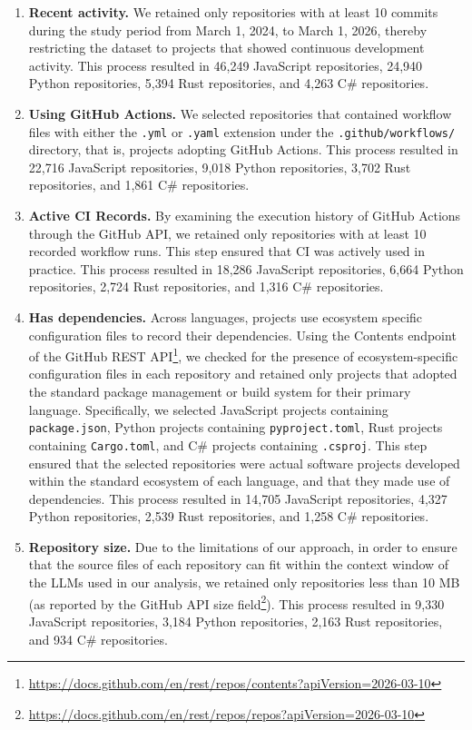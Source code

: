 \begin{enumerate}[label={\textbf{(PS\arabic*).}}, leftmargin=50pt]
    \item \textbf{Recent activity.}
    We retained only repositories with at least 10 commits during the study period from March 1, 2024, to March 1, 2026, thereby restricting the dataset to projects that showed continuous development activity. This process resulted in 46,249 JavaScript repositories, 24,940 Python repositories, 5,394 Rust repositories, and 4,263 C\# repositories.
    
    \item \textbf{Using GitHub Actions.}
    We selected repositories that contained workflow files with either the \texttt{.yml} or \texttt{.yaml} extension under the \texttt{.github/workflows/} directory, that is, projects adopting GitHub Actions. This process resulted in 22,716 JavaScript repositories, 9,018 Python repositories, 3,702 Rust repositories, and 1,861 C\# repositories.
    
    \item \textbf{Active CI Records.}
    By examining the execution history of GitHub Actions through the GitHub API, we retained only repositories with at least 10 recorded workflow runs. This step ensured that CI was actively used in practice. This process resulted in 18,286 JavaScript repositories, 6,664 Python repositories, 2,724 Rust repositories, and 1,316 C\# repositories.
    
    \item \textbf{Has dependencies.}
    Across languages, projects use ecosystem specific configuration files to record their dependencies. Using the Contents endpoint of the GitHub REST API\footnote{\url{https://docs.github.com/en/rest/repos/contents?apiVersion=2026-03-10}}, we checked for the presence of ecosystem-specific configuration files in each repository and retained only projects that adopted the standard package management or build system for their primary language. Specifically, we selected JavaScript projects containing \texttt{package.json}, Python projects containing \texttt{pyproject.toml}, Rust projects containing \texttt{Cargo.toml}, and C\# projects containing \texttt{.csproj}. This step ensured that the selected repositories were actual software projects developed within the standard ecosystem of each language, and that they made use of dependencies. This process resulted in 14,705 JavaScript repositories, 4,327 Python repositories, 2,539 Rust repositories, and 1,258 C\# repositories.
    \item \textbf{Repository size.}
    Due to the limitations of our approach, in order to ensure that the source files of each repository can fit within the context window of the LLMs used in our analysis, we retained only repositories less than 10 MB (as reported by the GitHub API size field\footnote{\url{https://docs.github.com/en/rest/repos/repos?apiVersion=2026-03-10}}). This process resulted in 9,330 JavaScript repositories, 3,184 Python repositories, 2,163 Rust repositories, and 934 C\# repositories.\\
\end{enumerate}

